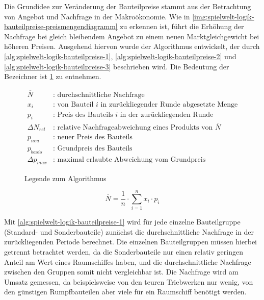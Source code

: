 Die Grundidee zur Veränderung der Bauteilpreise stammt aus der Betrachtung von Angebot und Nachfrage
in der Makroökonomie. Wie in
\ref{img:spielwelt-logik-bauteilpreise-preismengendiagramm}
zu erkennen ist, führt die Erhöhung der Nachfrage bei gleich bleibendem Angebot zu einem neuen
Marktgleichgewicht bei höheren Preisen. Ausgehend hiervon wurde der Algorithmus entwickelt, der
durch \ref{alg:spielwelt-logik-bauteilpreise-1}, \ref{alg:spielwelt-logik-bauteilpreise-2} und
\ref{alg:spielwelt-logik-bauteilpreise-3}
beschrieben wird. Die Bedeutung der Bezeichner ist \ref{alg:spielwelt-logik-bauteilpreise-legende}
zu entnehmen.

\newcommand{\pd}{\Delta{}p_{max}}
\begin{figure}[htb]
     \begin{align}
          \overline{N} &\text{: durchschnittliche Nachfrage}\nonumber \\
          x_i &\text{: von Bauteil $i$ in zurückliegender Runde abgesetzte Menge}\nonumber \\
          p_i &\text{: Preis des Bauteils $i$ in der zurückliegenden Runde}\nonumber \\
          \Delta{}N_{rel} &\text{: relative Nachfrageabweichung eines Produkts von $\overline{N}$}\nonumber \\
          p_{neu} &\text{: neuer Preis des Bauteils}\nonumber \\
          p_{basis} &\text{: Grundpreis des Bauteils}\nonumber \\
          \Delta{}p_{max} &\text{: maximal erlaubte Abweichung vom Grundpreis}\nonumber
     \end{align}
     \caption{Legende zum Algorithmus}
     \label{alg:spielwelt-logik-bauteilpreise-legende}
\end{figure}

\begin{equation}
     \overline{N} = \frac{1}{n} \cdot \sum\limits_{i=1}^n {x_i \cdot p_i}
     \label{alg:spielwelt-logik-bauteilpreise-1}
\end{equation}

Mit \ref{alg:spielwelt-logik-bauteilpreise-1} wird für jede einzelne Bauteilgruppe (Standard- und
Sonderbauteile) zunächst die durchschnittliche Nachfrage in der zurückliegenden Periode berechnet.
Die einzelnen Bauteilgruppen müssen hierbei getrennt betrachtet werden, da die Sonderbauteile nur
einen relativ geringen Anteil am Wert eines Raumschiffes haben, und die durchschnittliche Nachfrage
zwischen den Gruppen somit nicht vergleichbar ist. Die Nachfrage wird am Umsatz gemessen, da
beispielsweise von den teuren Triebwerken nur wenig, von den günstigen Rumpfbauteilen aber viele für
ein Raumschiff benötigt werden.


